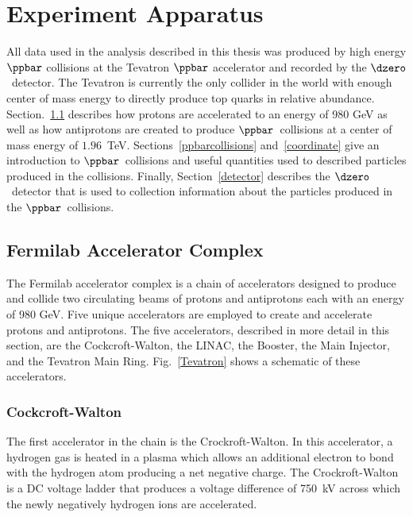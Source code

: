 \chapter{Experiment Apparatus}
\label{experiment}

All data used in the analysis described in this thesis was produced by high energy $\ppbar$ collisions at the Tevatron $\ppbar$ accelerator and recorded by the $\dzero$~detector. The Tevatron is currently the only collider in the world with enough center of mass energy to directly produce top quarks in relative abundance. Section.~\ref{tevatron} describes how protons are accelerated to an energy of 980 GeV as well as how antiprotons are created to produce $\ppbar$~collisions at a center of mass energy of $1.96$~TeV. Sections~\ref{ppbarcollisions} and~\ref{coordinate} give an introduction to $\ppbar$~collisions and useful quantities used to described particles produced in the collisions. Finally, Section~\ref{detector} describes the $\dzero$~detector that is used to collection information about the particles produced in the $\ppbar$~collisions. 

\section{Fermilab Accelerator Complex}
\label{tevatron}

The Fermilab accelerator complex is a chain of accelerators designed to produce and collide two circulating beams of protons and antiprotons each with an energy of 980 GeV. Five unique accelerators are employed to create and accelerate protons and antiprotons. The five accelerators, described in more detail in this section, are the Cockcroft-Walton, the LINAC, the Booster, the Main Injector, and the Tevatron Main Ring. Fig.~\ref{Tevatron} shows a schematic of these accelerators.



\subsection{Cockcroft-Walton}
The first accelerator in the chain is the Crockroft-Walton. In this accelerator, a hydrogen gas is heated in a plasma which allows an additional electron to bond with the hydrogen atom producing a net negative charge. The Crockroft-Walton is a DC voltage ladder that produces a voltage difference of 750~kV across which the newly negatively hydrogen ions are accelerated.

